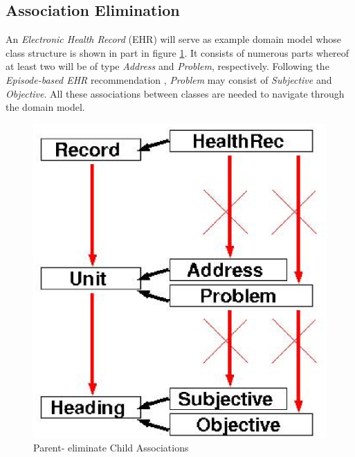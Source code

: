 %
%
%
%
%
%
%

\subsection{Association Elimination}
\label{association_elimination_heading}

An \emph{Electronic Health Record} (EHR) will serve as example domain model whose class
structure is shown in part in figure \ref{parent_eliminate_child_associations_figure}.
It consists of numerous parts whereof at least two will be of type \emph{Address}
and \emph{Problem}, respectively. Following the \emph{Episode-based EHR}
recommendation \cite{westerhof}, \emph{Problem} may consist of \emph{Subjective}
and \emph{Objective}. All these associations between classes are needed to
navigate through the domain model.

\begin{figure}[ht]
    \begin{center}
        \includegraphics[scale=0.4]{vector/parent_eliminate_child_associations.eps}
        \caption{Parent- eliminate Child Associations}
        \label{parent_eliminate_child_associations_figure}
    \end{center}
\end{figure}

